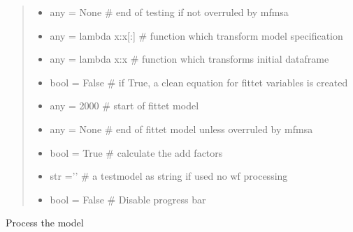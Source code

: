 \documentclass[letterpaper,10pt,english]{sphinxmanual}
\begin{document}
\begin{fulllineitems}
\begin{quote}
\begin{description}
\begin{itemize}
\item {} 
\sphinxAtStartPar
{} \textendash{} any = None    \# end of testing if not overruled by mfmsa

\item {} 
\sphinxAtStartPar
{} \textendash{} any = lambda x:x{[}:{]}    \# function which transform model specification

\item {} 
\sphinxAtStartPar
{} \textendash{} any = lambda x:x     \# function which transforms initial dataframe

\item {} 
\sphinxAtStartPar
{} \textendash{} bool = False \# if True, a clean equation for fittet variables is created

\item {} 
\sphinxAtStartPar
{} \textendash{} any = 2000   \# start of fittet model

\item {} 
\sphinxAtStartPar
{} \textendash{} any = None  \# end of fittet model unless overruled by mfmsa

\item {} 
\sphinxAtStartPar
{} \textendash{} bool = True  \# calculate the add factors

\item {} 
\sphinxAtStartPar
{} \textendash{} str =’’    \# a testmodel as string if used no wf processing

\item {} 
\sphinxAtStartPar
{} \textendash{} bool = False \# Disable progress bar

\end{itemize}

\end{description}\end{quote}

\begin{fulllineitems}
\label{\detokenize{index:modelgrabwf2.GrabWfModel.__post_init__}}
\pysigstartsignatures
{}
\pysigstopsignatures
\sphinxAtStartPar
Process the model


\end{fulllineitems}
\end{fulllineitems}
\end{document}
